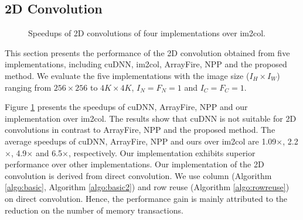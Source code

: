 \subsection{2D Convolution\label{sec:ex2dc}}
\begin{figure}
\centering
{}
\hspace{0em}
	
\caption{Speedups of 2D convolutions of four implementations over im2col.}
\label{fig:2druntime}
\end{figure}



This section presents the performance of the 2D convolution obtained from five implementations, including cuDNN, im2col,  ArrayFire,
NPP and the proposed method. We evaluate the five implementations with the image size ($I_H \times I_W$) ranging from $256 \times 256$ to $4K \times 4K$, $I_N=F_N=1$ and $I_C=F_C=1$.


Figure \ref{fig:2druntime} presents the speedups of cuDNN, ArrayFire, NPP and our implementation over im2col. The results show that cuDNN is not suitable for 2D convolutions in contrast to ArrayFire, NPP and the proposed method. The average speedups of cuDNN, ArrayFire, NPP and ours over im2col are 1.09$\times$, 2.2$\times$, 4.9$\times$ and 6.5$\times$, respectively. Our implementation exhibits superior performance over other implementations. Our implementation of the 2D convolution is derived from direct convolution. We use column (Algorithm \ref{algo:basic}, Algorithm \ref{algo:basic2}) and row reuse (Algorithm \ref{algo:rowreuse}) on direct convolution. Hence, the performance gain is mainly attributed to the reduction on the number of memory transactions.

